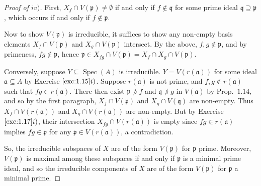 \documentclass[12pt,letterpaper]{article}
\theoremstyle{definition}
\theoremstyle{remark}
\numberwithin{figure}{problem}
\numberwithin{equation}{section}
\DeclareMathOperator{\Spec}{Spec}
\begin{document}
\begin{proof}[Proof of $iv)$]
  First, $X_f \cap V(\mathfrak{p}) \ne \emptyset$ if and only if $f \notin \mathfrak{q}$ for some prime ideal $\mathfrak{q} \supseteq \mathfrak{p}$, which occurs if and only if $f \notin \mathfrak{p}$.
  \par Now to show $V(\mathfrak{p})$ is irreducible, it suffices to show any non-empty basis elements $X_f \cap V(\mathfrak{p})$ and $X_g \cap V(\mathfrak{p})$ intersect. By the above, $f,g \notin \mathfrak{p}$, and by primeness, $fg \notin \mathfrak{p}$, hence
    $\mathfrak{p} \in X_{fg} \cap V(\mathfrak{p}) = X_f \cap X_g \cap V(\mathfrak{p})$.
    \par Conversely, suppose $Y \subseteq \Spec(A)$ is irreducible. $Y = V(r(\mathfrak{a}))$ for some ideal $\mathfrak{a} \subseteq A$ by Exercise $\ref{exc:1.15}i)$. Suppose $r(\mathfrak{a})$ is not prime, and $f,g \notin r(\mathfrak{a})$ such that $fg \in r(\mathfrak{a})$. There then exist $\mathfrak{p} \not\ni f$ and $\mathfrak{q} \not\ni g$ in $V(\mathfrak{a})$ by Prop.~$1.14$, and so by the first paragraph, $X_f \cap V(\mathfrak{p})$ and $X_g \cap V(\mathfrak{q})$ are non-empty. Thus $X_f \cap V(r(\mathfrak{a}))$ and $X_g \cap V(r(\mathfrak{a}))$ are non-empty. But by Exercise $\ref{exc:1.17}i)$, their intersection $X_{fg} \cap V(r(\mathfrak{a}))$ is empty since $fg \in r(\mathfrak{a})$ implies $fg \in \mathfrak{p}$ for any $\mathfrak{p} \in V(r(\mathfrak{a}))$, a contradiction.
    \par So, the irreducible subspaces of $X$ are of the form $V(\mathfrak{p})$ for $\mathfrak{p}$ prime. Moreover, $V(\mathfrak{p})$ is maximal among these subspaces if and only if $\mathfrak{p}$ is a minimal prime ideal, and so the irreducible components of $X$ are of the form $V(\mathfrak{p})$ for $\mathfrak{p}$ a minimal prime.
\end{proof}
\end{document}
